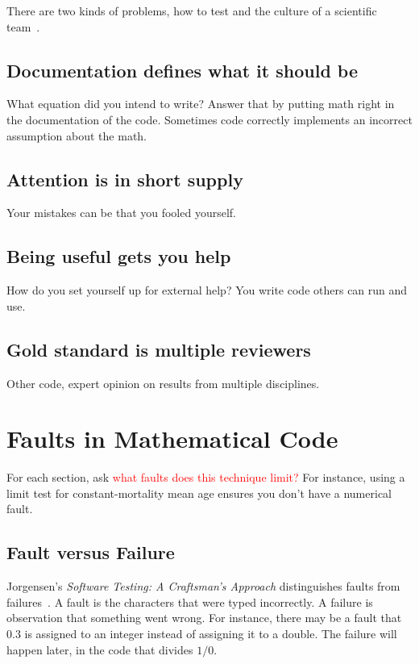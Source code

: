 \documentclass[fleqn,10pt]{olplainarticle}
\newcommand{\aside}[1]{\textcolor{red}{#1}}
\begin{document}
There are two kinds of problems, how to test and the culture
of a scientific team~\citep{neumann2016,kanewala2014}.


\subsection{Documentation defines what it should be}
What equation did you intend to write? Answer that by putting math right in
the documentation of the code. Sometimes code correctly implements an incorrect
assumption about the math.

\subsection{Attention is in short supply}
Your mistakes can be that you fooled yourself.

\subsection{Being useful gets you help}
How do you set yourself up for external help? You write code others can run and use.

\subsection{Gold standard is multiple reviewers}
Other code, expert opinion on results from multiple disciplines.


\appendix

\section{Faults in Mathematical Code}\label{sec:faults-and-failures}

For each section, ask \aside{what faults does this technique limit?}
For instance, using a limit test for constant-mortality mean age
ensures you don't have a numerical fault.

\subsection{Fault versus Failure}
Jorgensen's \emph{Software Testing: A Craftsman's Approach} distinguishes
faults from failures~\citep{jorgensen2013}.
A fault is the characters that were typed
incorrectly. A failure is observation that something went wrong.
For instance, there may be a fault that 0.3 is assigned to an integer
instead of assigning it to a double. The failure will happen later,
in the code that divides $1 / 0$.
\end{document}
